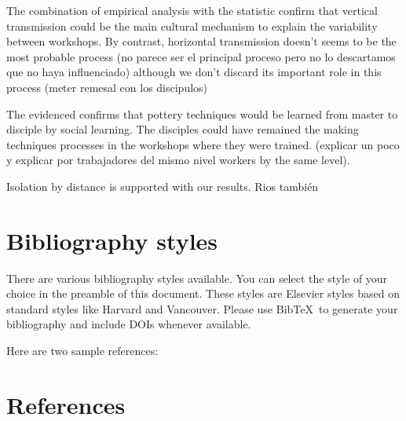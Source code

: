 \documentclass[review]{elsarticle}
\begin{document}
The combination of empirical analysis with the statistic confirm that vertical transmission could be the main cultural mechanism to explain the variability between workshops. By contrast, horizontal transmission doesn't seems to be the most probable process (no parece ser el principal proceso pero no lo descartamos que no haya influenciado) although we don't discard its important role in this process (meter remesal con los discipulos)

The evidenced confirms that pottery techniques would be learned from master to disciple by social learning. The disciples could have remained the making techniques processes in the workshops where they were trained. (explicar un poco y explicar por trabajadores del mismo nivel workers by the same level).


Isolation by distance is supported with our results. 
Rios también



\section{Bibliography styles}

There are various bibliography styles available. You can select the style of your choice in the preamble of this document. These styles are Elsevier styles based on standard styles like Harvard and Vancouver. Please use Bib\TeX\ to generate your bibliography and include DOIs whenever available.

Here are two sample references: \citep{mesoudi_cultural_2015}

\section*{References}


\end{document}
